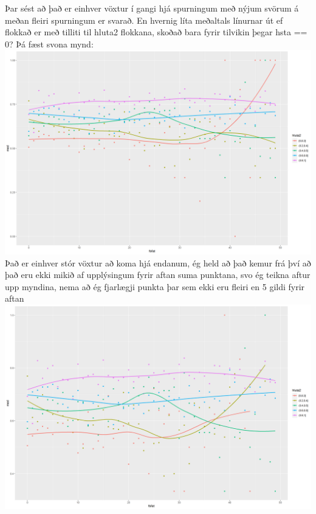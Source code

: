 \documentclass[
]{article}
\begin{document}
Þar sést að það er einhver vöxtur í gangi hjá spurningum með nýjum svörum á meðan fleiri spurningum er svarað. En hvernig líta meðaltals línurnar út ef flokkað er með tilliti til hluta2 flokkana, skoðað bara fyrir tilvikin þegar hsta == 0?
Þá fæst svona mynd:
\includegraphics{Img/meanbyhlutfall.png}
Það er einhver stór vöxtur að koma hjá endanum, ég held að það kemur frá því að það eru ekki mikið af upplýsingum fyrir aftan suma punktana, svo ég teikna aftur upp myndina, nema að ég fjarlægji punkta þar sem ekki eru fleiri en 5 gildi fyrir aftan
\includegraphics{Img/meanbyhlutfallLim.png}
\end{document}
